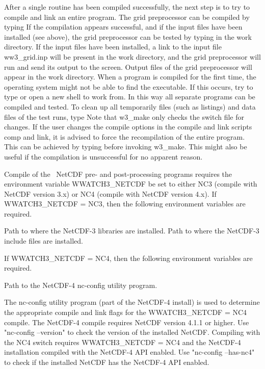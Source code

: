 After a single routine has been compiled successfully, the next step is to try
to compile and link an entire program. The grid preprocessor can be compiled
by typing  If the compilation appears successful,
and if the input files have been installed (see above), the grid preprocessor
can be tested by typing  in the work directory. If the
input files have been installed, a link to the input file {\file
ww3\_grid.inp} will be present in the work directory, and the grid
preprocessor will run and send its output to the screen. Output files of the
grid preprocessor will appear in the work directory. When a program is
compiled for the first time, the operating system might not be able to find
the executable. If this occurs, try to type  or open a new
shell to work from. In this way all separate programs can be compiled and
tested. To clean up all temporarily files (such as listings) and data files of
the test runs, type  Note that {\file w3\_make} only checks
the switch file for changes. If the user changes the compile options in the
compile and link scripts {\file comp} and {\file link}, it is advised to force
the recompilation of the entire program. This can be achieved by typing
 before invoking {\file w3\_make}. This
might also be useful if the compilation is unsuccessful for no apparent
reason.

\vspace{\baselineskip} 
\noindent
Compile of the \ws\ NetCDF pre- and post-processing programs requires the
environment variable {\file WWATCH3\_NETCDF} be set to either
NC3 (compile with NetCDF version 3.x) or
NC4 (compile with NetCDF version 4.x).
If {\file WWATCH3\_NETCDF} = NC3, then the following environment variables
are required.
\begin{flist}
 {Path to where the NetCDF-3 libraries are installed.}
 {Path to where the NetCDF-3 include files are installed.}
\end{flist}
If {\file WWATCH3\_NETCDF} = NC4, then the following environment variables
are required.
\begin{flist}
 {Path to the NetCDF-4 nc-config utility program.}
\end{flist}
The nc-config utility program (part of the NetCDF-4 install) is used to
determine the appropriate compile and link flags for the
{\file WWATCH3\_NETCDF} = NC4 compile.
The NetCDF-4 compile requires NetCDF version 4.1.1 or higher.
Use "{\code nc-config --version}" to check the version of the installed
NetCDF.
Compiling with the {\sc NC4} switch requires {\file WWATCH3\_NETCDF} = NC4
and the NetCDF-4 installation compiled with the NetCDF-4 API enabled.
Use "{\code nc-config --has-nc4}" to check if the installed NetCDF has
the NetCDF-4 API enabled.

